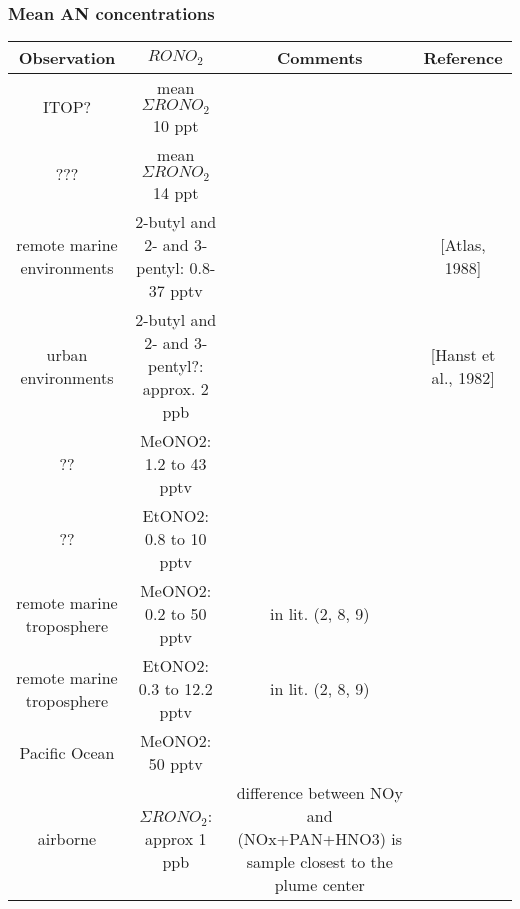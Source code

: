 \documentclass[11pt,a4paper]{article}
\begin{document}
\subsubsection{Mean AN concentrations}
\begin{table}
\begin{tabular}{cccc}
\hline
Observation & $RONO_2$                                  & Comments & Reference \\
\hline
ITOP?       & mean $\Sigma RONO_2$ 10 ppt               &          & \citep{Reeves2007} \\
???         & mean $\Sigma RONO_2$ 14 ppt               &          & \citep{Roberts1998} \\
remote marine environments & 2-butyl and 2- and 3-pentyl: 0.8-37 pptv & &\citep{Atherton1989} [Atlas, 1988]\\
urban environments         & 2-butyl and 2- and 3-pentyl?: approx. 2 ppb & & \citep{Atherton1989} [Hanst et al., 1982] \\
??                         & MeONO2: 1.2 to 43 pptv     &          & \citep{Chuck2002} \\
??                         & EtONO2: 0.8 to 10 pptv     &          & \citep{Chuck2002} \\
remote marine troposphere  & MeONO2: 0.2 to 50 pptv     & in lit. (2, 8, 9) & \citep{Chuck2002} \\
remote marine troposphere  & EtONO2: 0.3 to 12.2 pptv   & in lit. (2, 8, 9) & \citep{Chuck2002} \\
Pacific Ocean              & MeONO2: 50 pptv            &                   & \citep{Blake2003} \\
airborne                   & $\Sigma RONO_2$: approx 1 ppb         & difference between NOy and (NOx+PAN+HNO3) 
                                                                     is sample closest to the plume center & \citep{Neuman2012} \\
\hline
\end{tabular}
\end{table}
\end{document}
